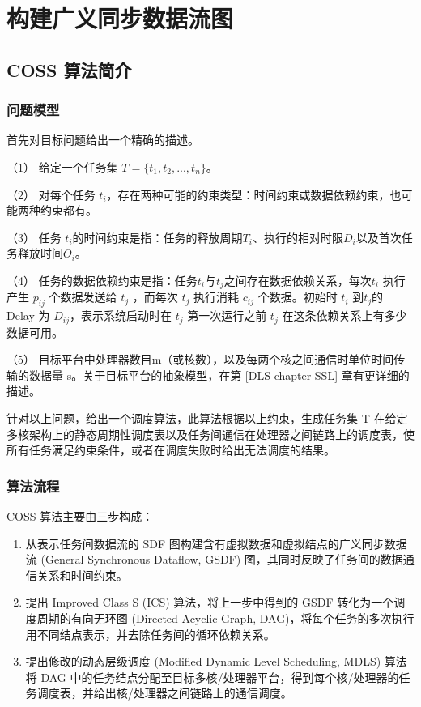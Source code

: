﻿%

\chapter{构建广义同步数据流图}
\label{chapter-SDF}

\section{COSS 算法简介}

\subsection{问题模型}


首先对目标问题给出一个精确的描述。

（1）	给定一个任务集 $T=\{t_1, t_2, ..., t_n\}$。

（2）	对每个任务 $t_i$，存在两种可能的约束类型：时间约束或数据依赖约束，也可能两种约束都有。

（3）	任务 $t_i$的时间约束是指：任务的释放周期$T_i$、执行的相对时限$D_i$以及首次任务释放时间$O_i$。

（4）	任务的数据依赖约束是指：任务$t_i$与$t_j$之间存在数据依赖关系，每次$t_i$ 执行产生 $p_{ij}$ 个数据发送给 $t_j$ ，而每次 $t_j$ 执行消耗 $c_{ij}$ 个数据。初始时 $t_i$ 到$t_j$的 Delay 为 $D_{ij}$，表示系统启动时在 $t_j$ 第一次运行之前 $t_j$ 在这条依赖关系上有多少数据可用。

（5）	目标平台中处理器数目m（或核数），以及每两个核之间通信时单位时间传输的数据量 s。关于目标平台的抽象模型，在第 \ref{DLS-chapter-SSL} 章有更详细的描述。

针对以上问题，给出一个调度算法，此算法根据以上约束，生成任务集 T 在给定多核架构上的静态周期性调度表以及任务间通信在处理器之间链路上的调度表，使所有任务满足约束条件，或者在调度失败时给出无法调度的结果。



\subsection{算法流程}

COSS 算法主要由三步构成：
\begin{enumerate}
   \item 从表示任务间数据流的 SDF 图构建含有虚拟数据和虚拟结点的广义同步数据流 (General Synchronous Dataflow, GSDF) 图，其同时反映了任务间的数据通信关系和时间约束。
   \item 提出 Improved Class S (ICS) 算法，将上一步中得到的 GSDF 转化为一个调度周期的有向无环图 (Directed Acyclic Graph, DAG)，将每个任务的多次执行用不同结点表示，并去除任务间的循环依赖关系。
   \item 提出修改的动态层级调度 (Modified Dynamic Level Scheduling, MDLS) 算法将 DAG 中的任务结点分配至目标多核/处理器平台，得到每个核/处理器的任务调度表，并给出核/处理器之间链路上的通信调度。
 \end{enumerate}

